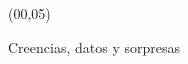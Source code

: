 \documentclass[shownotes,aspectratio=169]{beamer}
\newif\ifen
\newif\ifes
\newcommand{\en}[1]{\ifen#1\fi}
\newcommand{\es}[1]{\ifes#1\fi}
\begin{document}
\color{black!85}
\large

 

\begin{frame}
 
 \begin{textblock}{90}(00,05)
\begin{center}
 \huge  \textcolor{black!66}{Creencias, datos y sorpresas}
\end{center}
\end{textblock}

{}
\end{frame}

% 
% 
% 
\end{document}
